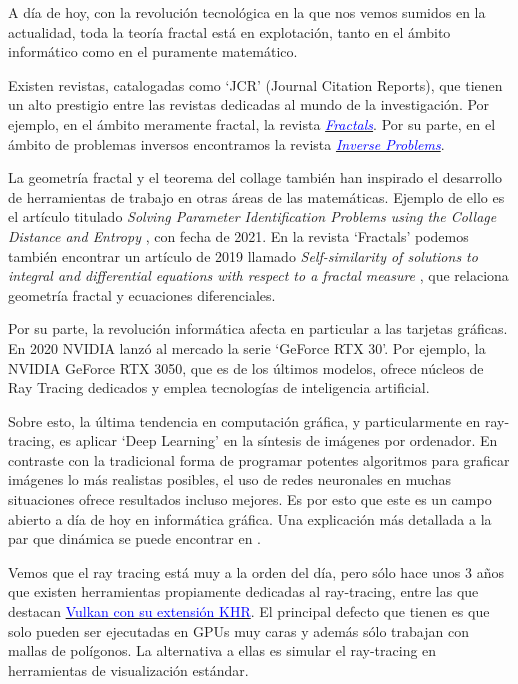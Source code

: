 A día de hoy, con la revolución tecnológica en la que nos vemos sumidos en la actualidad, toda la teoría fractal está en explotación, tanto en el ámbito informático como en el puramente matemático.

Existen revistas, catalogadas como `JCR' (Journal Citation Reports), que tienen un alto prestigio entre las revistas dedicadas al mundo de la investigación. Por ejemplo, en el ámbito meramente fractal, la revista \href{https://www.worldscientific.com/worldscinet/fractals}{\textcolor{blue}{\textit{Fractals}}}. Por su parte, en el ámbito de problemas inversos encontramos la revista \href{https://iopscience.iop.org/journal/0266-5611}{\textcolor{blue}{\textit{Inverse Problems}}}.

La geometría fractal y el teorema del collage también han inspirado el desarrollo de herramientas de trabajo en otras áreas de las matemáticas. Ejemplo de ello es el artículo titulado \textit{Solving Parameter Identification Problems using the Collage Distance and Entropy} \cite{LaTorre}, con fecha de 2021. En la revista `Fractals' podemos también encontrar un artículo de 2019 llamado \textit{Self-similarity of solutions to integral and differential equations with respect to a fractal measure} \cite{LaTorre2019}, que relaciona geometría fractal y ecuaciones diferenciales.

Por su parte, la revolución informática afecta en particular a las tarjetas gráficas.  En 2020 NVIDIA lanzó al mercado la serie `GeForce RTX 30'. Por ejemplo, la NVIDIA GeForce RTX 3050, que es de los últimos modelos, ofrece núcleos de Ray Tracing dedicados y emplea tecnologías de inteligencia artificial.

Sobre esto, la última tendencia en computación gráfica, y particularmente en ray-tracing, es aplicar `Deep Learning' en la síntesis de imágenes por ordenador. En contraste con la tradicional forma de programar potentes algoritmos para graficar imágenes lo más realistas posibles, el uso de redes neuronales en muchas situaciones ofrece resultados incluso mejores. Es por esto que este es un campo abierto a día de hoy en informática gráfica. Una explicación más detallada a la par que dinámica se puede encontrar en \cite{RT-AI}.

Vemos que el ray tracing está muy a la orden del día, pero sólo hace unos 3 años que existen herramientas propiamente dedicadas al ray-tracing, entre las que destacan \href{https://nvpro-samples.github.io/vk_raytracing_tutorial_KHR/}{\textcolor{blue}{Vulkan con su extensión KHR}}. El principal defecto que tienen es que solo pueden ser ejecutadas en GPUs muy caras y además sólo trabajan con mallas de polígonos. La alternativa a ellas es simular el ray-tracing en herramientas de visualización estándar.

